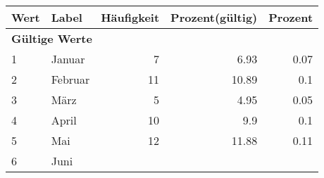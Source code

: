     \begin{longtable}{lXrrr}
     \toprule
     \textbf{Wert} & \textbf{Label} & \textbf{Häufigkeit} & \textbf{Prozent(gültig)} & \textbf{Prozent} \\
     \endhead
     \midrule
     \multicolumn{5}{l}{\textbf{Gültige Werte}}\\

     1 &
     \multicolumn{1}{X}{ Januar   } &


       \num{7} &
       \num[round-mode=places,round-precision=2]{6.93} &
         \num[round-mode=places,round-precision=2]{0.07} \\

     2 &
     \multicolumn{1}{X}{ Februar   } &


       \num{11} &
       \num[round-mode=places,round-precision=2]{10.89} &
         \num[round-mode=places,round-precision=2]{0.1} \\

     3 &
     \multicolumn{1}{X}{ März   } &


       \num{5} &
       \num[round-mode=places,round-precision=2]{4.95} &
         \num[round-mode=places,round-precision=2]{0.05} \\

     4 &
     \multicolumn{1}{X}{ April   } &


       \num{10} &
       \num[round-mode=places,round-precision=2]{9.9} &
         \num[round-mode=places,round-precision=2]{0.1} \\

     5 &
     \multicolumn{1}{X}{ Mai   } &


       \num{12} &
       \num[round-mode=places,round-precision=2]{11.88} &
         \num[round-mode=places,round-precision=2]{0.11} \\

     6 &
     \multicolumn{1}{X}{ Juni   } &



\end{longtable}
